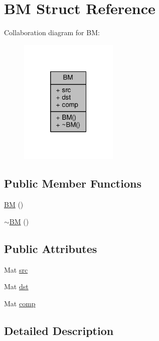 \hypertarget{struct_b_m}{}\section{B\+M Struct Reference}
\label{struct_b_m}


Collaboration diagram for B\+M\+:\nopagebreak
\begin{figure}[H]
\begin{center}
\leavevmode
\includegraphics[width=133pt]{struct_b_m__coll__graph}
\end{center}
\end{figure}
\subsection*{Public Member Functions}
\begin{DoxyCompactItemize}
\item 
\hyperlink{struct_b_m_aef32a12f4f89e4000bf5390ceda762ae}{B\+M} ()
\item 
\hyperlink{struct_b_m_a3bbd28d969bcbe04dc0b57e4fabeaf65}{$\sim$\+B\+M} ()
\end{DoxyCompactItemize}
\subsection*{Public Attributes}
\begin{DoxyCompactItemize}
\item 
Mat \hyperlink{struct_b_m_a16e469d839cd52f63a935fb65d5f2f37}{src}
\item 
Mat \hyperlink{struct_b_m_a5dcd272086f1e23ec2c205a902dca28d}{dst}
\item 
Mat \hyperlink{struct_b_m_a91a2c5f22e9d50eef5fb7447d986e081}{comp}
\end{DoxyCompactItemize}


\subsection{Detailed Description}


